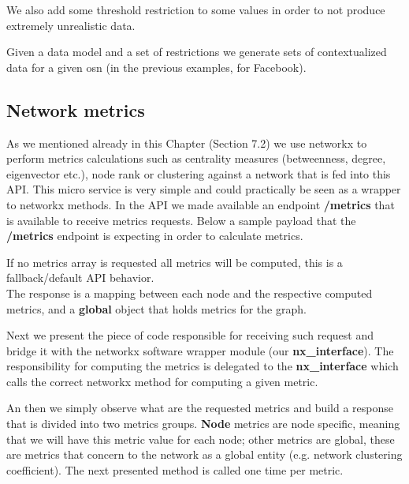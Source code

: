 We also add some threshold restriction to some values in order to not produce extremely unrealistic data.



Given a data model and a set of restrictions we generate sets of contextualized data for a given \gls{osn} (in the previous examples, for Facebook).

\subsection{Network metrics}
As we mentioned already in this Chapter (Section 7.2) we use networkx \citep{hagberg2013networkx} to perform metrics calculations such as centrality measures (betweenness, degree, eigenvector etc.), node rank or clustering against a network that is fed into this API. This micro service is very simple and could practically be seen as a wrapper to networkx methods. In the API we made available an endpoint \textbf{/metrics} that is available to receive metrics requests. Below a sample payload that the \textbf{/metrics} endpoint is expecting in order to calculate metrics.



If no metrics array is requested all metrics will be computed, this is a fallback/default API behavior.\\
\indent The response is a mapping between each node and the respective computed metrics, and a \textbf{global} object that holds metrics for the graph.



Next we present the piece of code responsible for receiving such request and bridge it with the networkx software wrapper module (our \textbf{nx\_interface}). The responsibility for computing the metrics is delegated to the \textbf{nx\_interface} which calls the correct networkx method for computing a given metric.



An then we simply observe what are the requested metrics and build a response that is divided into two metrics groups. \textbf{Node} metrics are node specific, meaning that we will have this metric value for each node; other metrics are global, these are metrics that concern to the network as a global entity (e.g. network clustering coefficient). The next presented method is called one time per metric.

